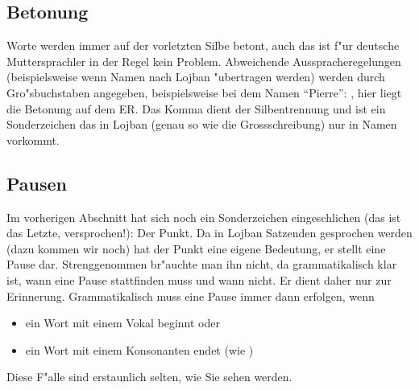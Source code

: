 \subsection{Betonung}
Worte werden immer auf der vorletzten Silbe betont, auch das ist f"ur deutsche Muttersprachler in der Regel kein Problem. Abweichende
Ausspracheregelungen (beispielsweise wenn Namen nach Lojban "ubertragen werden) werden durch Gro"sbuchstaben angegeben,
beispielsweise bei dem Namen ``Pierre'': , hier liegt die Betonung auf dem ER. Das Komma dient der Silbentrennung und ist
ein Sonderzeichen das in Lojban (genau so wie die Grossschreibung) nur in Namen vorkommt.

\subsection{Pausen}
Im vorherigen Abschnitt hat sich noch ein Sonderzeichen eingeschlichen (das ist das Letzte, versprochen!): Der Punkt. Da in Lojban
Satzenden gesprochen werden (dazu kommen wir noch) hat der Punkt eine eigene Bedeutung, er stellt eine Pause dar. Strenggenommen
br"auchte man ihn nicht, da grammatikalisch klar ist, wann eine Pause stattfinden muss und wann nicht. Er dient daher nur zur Erinnerung.
Grammatikalisch muss eine Pause immer dann erfolgen, wenn
\begin{itemize}
\item ein Wort mit einem Vokal beginnt oder
\item ein Wort mit einem Konsonanten endet (wie )
\end{itemize}
Diese F"alle sind erstaunlich selten, wie Sie sehen werden.

